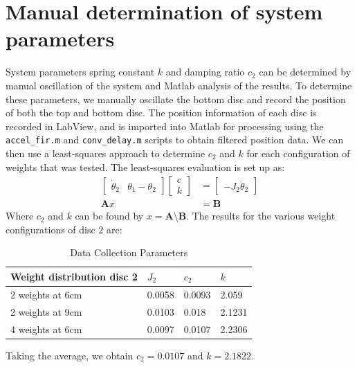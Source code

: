 \documentclass[11pt,titlepage]{article}
\begin{document}
\section{Manual determination of system parameters}
	System parameters spring constant $k$ and damping ratio $c_2$ can be determined by manual oscillation of the system and Matlab analysis of the results. To determine these parameters, we manually oscillate the bottom disc and record the position of both the top and bottom disc. The position information of each disc is recorded in LabView, and is imported into Matlab for processing using the \texttt{accel\_fir.m} and \texttt{conv\_delay.m} scripts to obtain filtered position data. We can then use a least-squares approach to determine $c_2$ and $k$ for each configuration of weights that was tested. The least-squares evaluation is set up as:
	\begin{align}
	\begin{bmatrix}
		\dot \theta_2 & \theta_1-\theta_2
	\end{bmatrix} 
	\begin{bmatrix}
		c\\
		k
	\end{bmatrix}&=
	\begin{bmatrix}
		-J_2\ddot \theta_2
	\end{bmatrix}\\
	\bm{A}x&=\bm{B}
	\end{align}
	Where $c_2$ and $k$ can be found by $x=\bm{A}$\textbackslash$\bm{B}$. The results for the various weight configurations of disc 2 are:
	    \begin{table}[H]
            \centering
            \begin{tabular}{|m{5cm}|m{3cm}|m{3cm}|m{3cm}|} 
                \hline
                Weight distribution disc 2 & $J_2$ & $c_2$ & $k$ \\ 
                \hline
                2 weights at 6cm & 0.0058 & 0.0093 & 2.059\\
                \hline
                2 weights at 9cm & 0.0103 & 0.018 & 2.1231\\
                \hline
                4 weights at 6cm & 0.0097 & 0.0107 & 2.2306\\
                \hline
            \end{tabular}
            \caption{Data Collection Parameters} \label{table:data_param}
        \end{table}
         Taking the average, we obtain $c_2 = 0.0107$ and $k=2.1822$.
	
\end{document}
